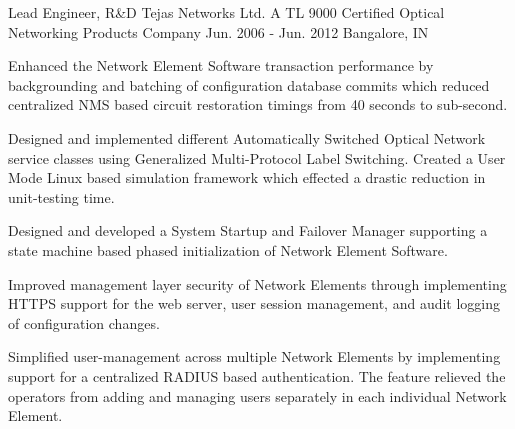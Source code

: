 \begin{cventries}
  \expentry
    {Lead Engineer, R\&D} %
    {Tejas Networks} {Ltd.} %
    {A TL 9000 Certified Optical Networking Products Company} %
    {Jun. 2006 - Jun. 2012} %
    {Bangalore, IN} %
    {
      \begin{cvitems} %
        \item {Enhanced the Network Element Software transaction performance by backgrounding and batching of configuration database commits which reduced centralized NMS based circuit restoration timings from 40 seconds to sub-second.}
        \item {Designed and implemented different Automatically Switched Optical Network service classes using Generalized Multi-Protocol Label Switching. Created a User Mode Linux based simulation framework which effected a drastic reduction in unit-testing time.}
	\item {Designed and developed a System Startup and Failover Manager supporting a state machine based phased initialization of Network Element Software.}
	\item {Improved management layer security of Network Elements through implementing HTTPS support for the web server, user session management, and audit logging of configuration changes.}
	\item {Simplified user-management across multiple Network Elements by implementing support for a centralized RADIUS based authentication. The feature relieved the operators from adding and managing users separately in each individual Network Element.}
      \end{cvitems}
    }

\end{cventries}
